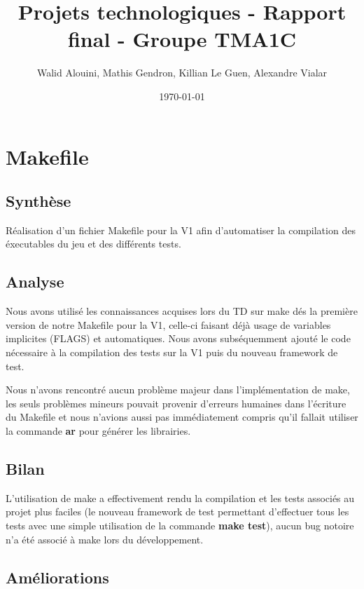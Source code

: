 \documentclass[12pt]{article}
\begin{document}
\title{Projets technologiques - Rapport final - Groupe TMA1C}
\author{Walid Alouini, Mathis Gendron, Killian Le Guen, Alexandre Vialar}
\date{\today}

\maketitle
\tableofcontents



\section{Makefile}
\subsection{Synth\`ese}

R\'ealisation d'un fichier Makefile pour la V1 afin d'automatiser la compilation des \'executables du jeu et des diff\'erents tests.

\subsection{Analyse}

Nous avons utilis\'e les connaissances acquises lors du TD sur make d\'es la premi\`ere version
de notre Makefile pour la V1, celle-ci faisant d\'ej\`a usage de variables implicites (FLAGS) et automatiques.
Nous avons subs\'equemment ajout\'e le code n\'ecessaire \`a la compilation des tests sur la V1 puis du nouveau
framework de test.

Nous n'avons rencontr\'e aucun probl\`eme majeur dans l'impl\'ementation de make, les seuls
probl\`emes mineurs pouvait provenir d'erreurs humaines dans l'\'ecriture du Makefile et
nous n'avions aussi pas imm\'ediatement compris qu'il fallait utiliser la commande \textbf{ar}
pour g\'en\'erer les librairies.

\subsection{Bilan}

L'utilisation de make a effectivement rendu la compilation et les tests associ\'es au projet plus faciles 
(le nouveau framework de test permettant d'effectuer tous les tests avec une simple utilisation de la 
commande \textbf{make test}), aucun bug notoire n'a \'et\'e associ\'e \`a make lors du d\'eveloppement.

\subsection{Am\'eliorations}
\end{document}
